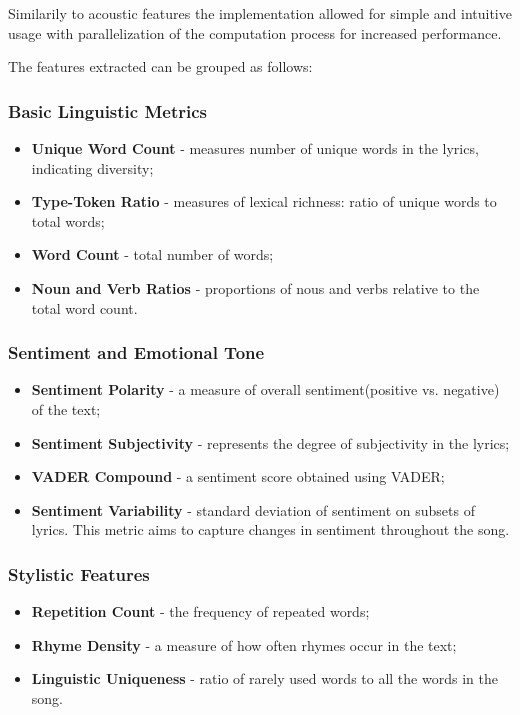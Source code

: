 Similarily to acoustic features the implementation allowed for simple and
intuitive usage  with parallelization of the computation process for increased
performance. 

The features extracted can be grouped as follows:

\subsubsection*{Basic Linguistic Metrics}
\begin{itemize}
  \item \textbf{Unique Word Count} - measures number of unique words in the
    lyrics, indicating diversity;
  \item \textbf{Type-Token Ratio} - measures of lexical richness: ratio of
    unique words to total words;
  \item \textbf{Word Count} - total  number of words;
  \item \textbf{Noun and Verb Ratios} - proportions of nous and verbs relative
    to the total word count.
\end{itemize}


\subsubsection*{Sentiment and Emotional Tone}
\begin{itemize}
  \item \textbf{Sentiment Polarity} - a measure of overall sentiment(positive
    vs. negative) of the text;
  \item \textbf{Sentiment Subjectivity} - represents the degree of subjectivity
    in the lyrics;
  \item \textbf{VADER Compound} - a sentiment score obtained using VADER;
  \item \textbf{Sentiment Variability} - standard deviation of sentiment on
    subsets of lyrics. This metric aims to capture changes in sentiment
    throughout the song.
\end{itemize}


\subsubsection*{Stylistic Features}
\begin{itemize}
  \item \textbf{Repetition Count} - the frequency of repeated words;
  \item \textbf{Rhyme Density} - a measure of how often rhymes occur in the
    text;
  \item \textbf{Linguistic Uniqueness} - ratio of rarely used words to all the
    words in the song.
\end{itemize}


